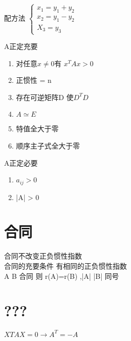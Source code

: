 \documentclass[UTF8]{ctexart}
\begin{document}
配方法
$\begin{cases}
  x_1=y_1+y_2 \\
  x_2=y_1-y_2 \\
  X_3=y_3
\end{cases}$

A正定充要
\begin{enumerate}
  \item 对任意$x\neq 0$有 $x^T A x > 0$
  \item 正惯性 = n
  \item 存在可逆矩阵D 使$D^TD$
  \item $A\simeq E$
  \item 特值全大于零
  \item 顺序主子式全大于零
\end{enumerate}

A正定必要
\begin{enumerate}
  \item $a_{ij} >0 $
  \item |A| > 0
\end{enumerate}

\section{合同}
合同不改变正负惯性指数 \\
合同的充要条件 有相同的正负惯性指数 \\
A B 合同 则 r(A)=r(B) ,|A| |B| 同号 \\
\section{???}
$XTAX=0 \rightarrow A^T=-A$
\end{document}
